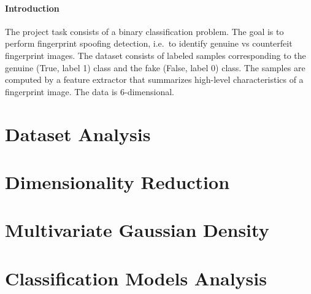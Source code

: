 \documentclass{article}
\begin{document}
    


    \paragraph{Introduction}
    The project task consists of a binary classification problem.
    The goal is to perform fingerprint spoofing detection, i.e.\ to identify genuine vs counterfeit fingerprint images.
    The dataset consists of labeled samples corresponding to the genuine (True, label 1) class and the fake (False, label 0) class.
    The samples are computed by a feature extractor that summarizes high-level characteristics of a fingerprint
    image.
    The data is 6-dimensional.



    \section{Dataset Analysis}
    \label{sec:datasetAnalysis}
    




    \section{Dimensionality Reduction}
    \label{sec:dimensionalityReduction}
    



    \section{Multivariate Gaussian Density}
    \label{sec:multivariateGaussianDensity}
    



    \section{Classification Models Analysis}
    \label{sec:classificationModels}
    
\end{document}

